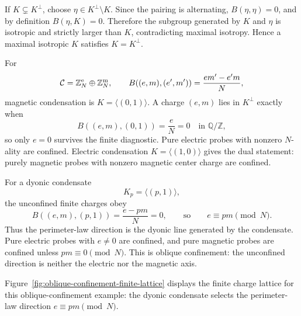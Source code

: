 If \(K\subsetneq K^\perp\), choose \(\eta\in K^\perp\setminus K\).  Since the
pairing is alternating, \(B(\eta,\eta)=0\), and by definition
\(B(\eta,K)=0\).  Therefore the subgroup generated by \(K\) and \(\eta\) is
isotropic and strictly larger than \(K\), contradicting maximal isotropy.
Hence a maximal isotropic \(K\) satisfies \(K=K^\perp\).

\begin{example}
\label{ex:su-n-finite-oblique-confinement}
For
\[
  \mathcal C=\mathbb Z_N^{\rm e}\oplus\mathbb Z_N^{\rm m},
  \qquad
  B((e,m),(e',m'))=\frac{em'-e'm}{N},
\]
magnetic condensation is \(K=\langle(0,1)\rangle\).  A charge
\((e,m)\) lies in \(K^\perp\) exactly when
\[
  B((e,m),(0,1))=\frac{e}{N}=0\quad \text{in }\mathbb Q/\mathbb Z,
\]
so only \(e=0\) survives the finite diagnostic.  Pure electric probes with
nonzero \(N\)-ality are confined.  Electric condensation
\(K=\langle(1,0)\rangle\) gives the dual statement: purely magnetic probes
with nonzero magnetic center charge are confined.

For a dyonic condensate
\[
  K_p=\langle(p,1)\rangle ,
\]
the unconfined finite charges obey
\[
  B((e,m),(p,1))=\frac{e-pm}{N}=0,
  \qquad\text{so}\qquad e\equiv pm\pmod N .
\]
Thus the perimeter-law direction is the dyonic line generated by the
condensate.  Pure electric probes with \(e\ne0\) are confined, and pure
magnetic probes are confined unless \(pm\equiv0\pmod N\).  This is oblique
confinement: the unconfined direction is neither the electric nor the
magnetic axis.
\end{example}

Figure~\ref{fig:oblique-confinement-finite-lattice} displays the finite charge
lattice for this oblique-confinement example: the dyonic condensate selects the
perimeter-law direction \(e\equiv pm\pmod N\).

